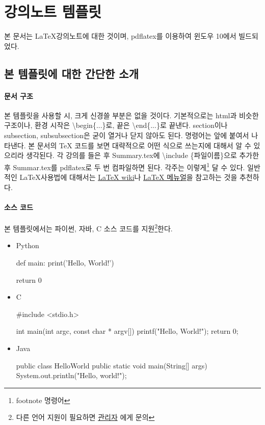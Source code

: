 \section{강의노트 템플릿} 

본 문서는 \LaTeX 강의노트에 대한 것이며, pdflatex를 이용하여 윈도우 10에서 빌드되었다. 

\subsection{본 템플릿에 대한 간단한 소개}

\paragraph{문서 구조} 본 템플릿을 사용할 시, 크게 신경쓸 부분은 없을 것이다. 기본적으로는 html과 비슷한 구조이나, 환경 시작은 {\textbackslash}begin\{...\}로, 끝은 {\textbackslash}end\{...\}로 끝낸다. section이나 subsection, subsubsection은 굳이 열거나 닫지 않아도 된다. 명령어는  앞에 붙여서 나타낸다. 본 문서의 TeX 코드를 보면 대략적으로 어떤 식으로 쓰는지에 대해서 알 수 있으리라 생각된다. 각 강의를 들은 후 Summary.tex에 \textbackslash include \{파일이름\}으로 추가한 후 Summar.tex를 pdflatex로 두 번 컴파일하면 된다. 각주는 이렇게\footnote{footnote 명령어} 달 수 있다. 일반적인 \LaTeX 사용법에 대해서는 \href{http://legacy-wiki.dgoon.net/doku.php?id=latex:latex}{LaTeX wiki}나 \href{http://ftp.isu.edu.tw/pub/Unix/CTAN/info/lshort/korean/lshort-kr.pdf}{LaTeX 메뉴얼}을 참고하는 것을 추천하다.

\paragraph{소스 코드} 본 템플릿에서는 파이썬, 자바, C 소스 코드를 지원\footnote{다른 언어 지원이 필요하면 \href{mailto:principia\_12@kaist.ac.kr}{관리자} 에게 문의}한다. 
\begin{itemize} 

\item{Python} 

\begin{Python} 
def main:
    print('Hello, World!')
    
    return 0
    
\end{Python} 

\item{C}


\begin{C} 
#include <stdio.h>

int main(int argc, const char * argv[]) 
{
    printf("Hello, World!\n");
    return 0;
}    
\end{C} 

\item{Java}

\begin{Java} 
public class HelloWorld {
    public static void main(String[] args) {
        System.out.println("Hello, world!");
    }
}
\end{Java} 

\end{itemize}

    